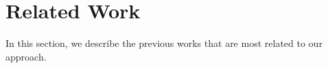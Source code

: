 \documentclass[letterpaper]{article} %
\begin{document}

\section{Related Work}
In this section, we describe the previous works that are most related to our approach.
\end{document}
